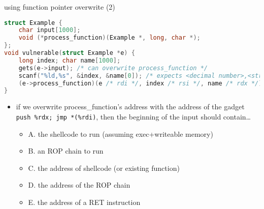 \begin{frame}[fragile,label=useFPtrOverwrite2]{using function pointer overwrite (2)}
\begin{lstlisting}[language=C,style=script]
struct Example {
    char input[1000];
    void (*process_function)(Example *, long, char *);
};
void vulnerable(struct Example *e) {
    long index; char name[1000];
    gets(e->input); /* can overwrite process_function */
    scanf("%ld,%s", &index, &name[0]); /* expects <decimal number>,<string> */
    (e->process_function)(e /* rdi */, index /* rsi */, name /* rdx */);
}
\end{lstlisting}
\begin{itemize}
\item \small if we overwrite process\_function's address with the address of the gadget
    \texttt{push \%rdx; jmp *(\%rdi)}, then the beginning of the input should contain\ldots \\
    \begin{itemize}
    \item A. the shellcode to run (assuming exec+writeable memory)
    \item B. an ROP chain to run
    \item C. the address of shellcode (or existing function) 
    \item D. the address of the ROP chain 
    \item E. the address of a RET instruction
    \end{itemize}
\end{itemize}
\end{frame}

